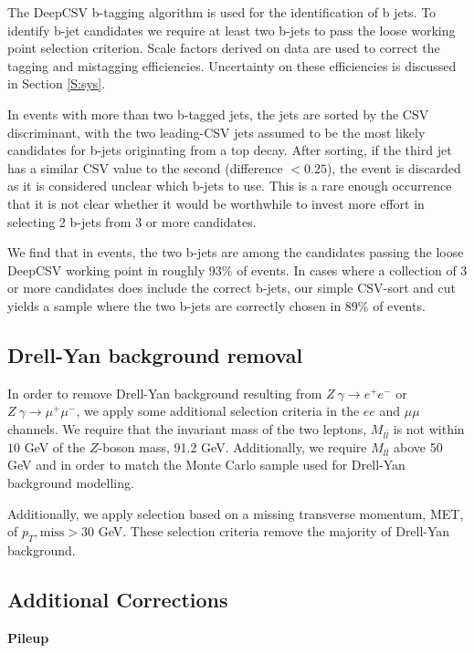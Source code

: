 The DeepCSV b-tagging algorithm is used for the identification of b jets. To identify b-jet candidates we require at least two b-jets to pass the loose working point selection criterion. Scale factors derived on data are used to correct the tagging and mistagging efficiencies. Uncertainty on these efficiencies is discussed in Section \ref{S:sys}.

 In events with more than two b-tagged jets, the jets are sorted by the CSV discriminant, with the two leading-CSV jets assumed to be the most likely candidates for b-jets originating from a top decay. After sorting, if the third jet has a similar CSV value to the second (difference $<0.25$), the event is discarded as it is considered unclear which b-jets to use. This is a rare enough occurrence that it is not clear whether it would be worthwhile to invest more effort in selecting 2 b-jets from 3 or more candidates. 
 
 We find that in \ttbar events, the two b-jets are among the candidates passing the loose DeepCSV working point in roughly 93\% of events. In cases where a collection of 3 or more candidates does include the correct b-jets, our simple CSV-sort and cut yields a \ttbar sample where the two b-jets are correctly chosen in 89\% of events.
   


\subsection*{Drell-Yan background removal}

In order to remove Drell-Yan background resulting from $Z\ \gamma \rightarrow e^+e^- $ or $Z \ \gamma \rightarrow \mu^+\mu^-$, we apply some additional selection criteria in the $ee$ and $\mu\mu$ channels. We require that the invariant mass of the two leptons, $M_{l\bar{l}}$ is not within $10$ \unit{GeV} of the $Z$-boson mass, 91.2 \unit{GeV}. Additionally, we require $M_{l\bar{l}}$  above 50\,GeV and in order to match the Monte Carlo sample used for Drell-Yan background modelling. 

Additionally, we apply selection based on a missing transverse momentum, MET, of $p_{T}\mathrm{,miss}>30$ \unit{GeV}. These selection criteria remove the majority of Drell-Yan background. 

\subsection{Additional Corrections}
\par \noindent
\textbf{Pileup }

